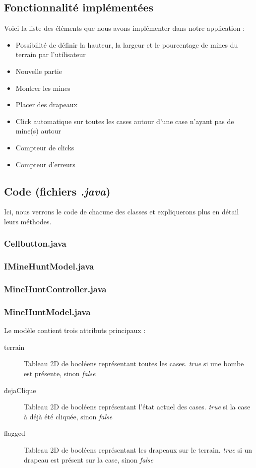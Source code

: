 \documentclass[a4paper, 10pt]{article}
\begin{document}
\subsection{Fonctionnalité implémentées}
Voici la liste des éléments que nous avons implémenter dans notre application :
\begin{itemize}
\item Possibilité de définir la hauteur, la largeur et le pourcentage de mines du terrain par l'utilisateur
\item Nouvelle partie
\item Montrer les mines
\item Placer des drapeaux
\item Click automatique sur toutes les cases autour d'une case n'ayant pas de mine(s) autour
\item Compteur de clicks
\item Compteur d'erreurs
\end{itemize}
\subsection{Code (fichiers \emph{.java})}
Ici, nous verrons le code de chacune des classes et expliquerons plus en détail leurs méthodes.
\subsubsection{Cellbutton.java}

\subsubsection{IMineHuntModel.java}

\subsubsection{MineHuntController.java}

\subsubsection{MineHuntModel.java}
Le modèle contient trois attributs principaux :
\begin{description}
\item[terrain] Tableau 2D de booléens représentant toutes les cases. \emph{true} si une bombe est présente, sinon \emph{false}
\item[dejaClique] Tableau 2D de booléens représentant l'état actuel des cases. \emph{true} si la case à déjà été cliquée, sinon \emph{false}
\item[flagged] Tableau 2D de booléens représentant les drapeaux sur le terrain. \emph{true} si un drapeau est présent sur la case, sinon \emph{false}
\end{description}

\end{document}

